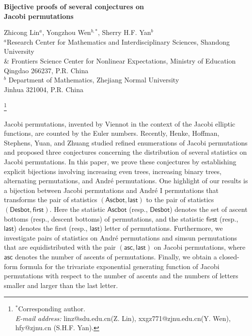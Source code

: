 \documentclass[12pt]{article}
\numberwithin{equation}{section}
\theoremstyle{plain}
\def\asc{\mathsf{asc}}
\def\Ascbot{\mathsf{Ascbot}}
\def\Desbot{\mathsf{Desbot}}
\def\first{\mathsf{first}}
\def\last{\mathsf{last}}
\begin{document}
	\begin{center}
		{\Large\bf Bijective proofs of several conjectures on\\ Jacobi permutations}
	\end{center}
	
	\begin{center}
		{\small Zhicong Lin$^a$,  Yongzhou Wen$^{b,*}$, Sherry H.F. Yan$^b$}\\[4pt]
		$^a$Research Center for Mathematics and Interdisciplinary Sciences,  Shandong University\\
		\& Frontiers Science Center for Nonlinear Expectations, Ministry of Education \\
		Qingdao 266237, P.R. China\\[2pt]
		$^b$ Department of Mathematics, Zhejiang Normal University\\
		Jinhua 321004, P.R. China
	\end{center}
	\footnote{$^*$Corresponding author. \\{\em E-mail address:} linz@sdu.edu.cn(Z. Lin),    xxgz771@zjnu.edu.cn(Y. Wen), hfy@zjnu.cn (S.H.F. Yan).}
	
	\vskip0.1in
	Jacobi permutations,   invented  by Viennot in the context of  the Jacobi elliptic functions, are  counted by the Euler numbers.  
	Recently, Henke, Hoffman, Stephens, Yuan, and Zhuang studied refined enumerations of Jacobi permutations and proposed three conjectures concerning the distribution of several statistics  on  Jacobi permutations. In this paper, we prove these conjectures by establishing explicit bijections involving  increasing even trees,  increasing binary trees, alternating permutations, and André permutations.   One
 highlight of our results is  a bijection between Jacobi permutations and André I permutations that transforms the pair of statistics  $(\Ascbot, \last)$ to  the pair of statistics $(\Desbot, \first)$. Here  the statistic $\Ascbot$ (resp., $\Desbot$) denotes the set of ascent bottoms (resp., descent bottoms) of permutations,  and the statistic $\first$ (resp., $\last$) denotes the first (resp., $\last$) letter of  permutations.  Furthermore, we investigate pairs of statistics on Andr\'e permutations and simsun permutations that are equidistributed with  the pair $(\asc, \last)$ on Jacobi permutations, where $\asc$ denotes the number of ascents of permutations.  Finally, we obtain a closed-form formula for the trivariate exponential generating function of Jacobi permutations with respect to the number of ascents and the numbers of letters smaller and larger than the last letter. 
	
\end{document}
